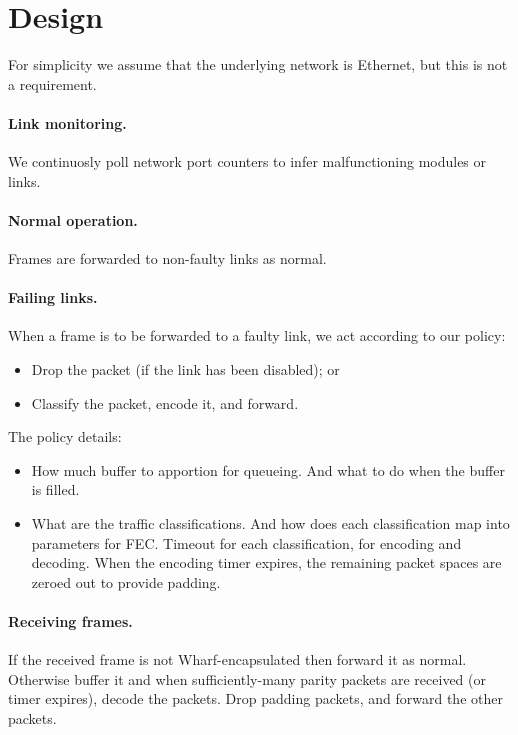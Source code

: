 \documentclass[sigconf]{acmart}
\newcommand{\OurSys}{Wharf\xspace}
\begin{document}
\section{Design}
For simplicity we assume that the underlying network is Ethernet, but this is
not a requirement.

\paragraph{Link monitoring.}
  We continuosly poll network port counters to infer malfunctioning modules or links.

\paragraph{Normal operation.}
  Frames are forwarded to non-faulty links as normal.

\paragraph{Failing links.}
  When a frame is to be forwarded to a faulty link, we act according to our policy:
  \begin{itemize}
    \item Drop the packet (if the link has been disabled); or
    \item Classify the packet, encode it, and forward.
  \end{itemize}

The policy details:
\begin{itemize}
  \item How much buffer to apportion for queueing.
      And what to do when the buffer is filled.
  \item What are the traffic classifications.
      And how does each classification map into parameters for FEC.
      Timeout for each classification, for encoding and decoding.
      When the encoding timer expires, the remaining packet spaces are zeroed out to provide padding.
\end{itemize}

\paragraph{Receiving frames.}
If the received frame is not \OurSys-encapsulated then forward it as normal.
Otherwise buffer it and when sufficiently-many parity packets are received (or timer expires), decode the packets. Drop padding packets, and forward the other packets.
\end{document}

